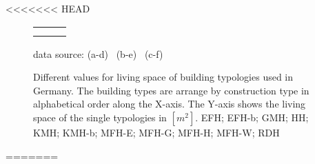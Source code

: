 <<<<<<< HEAD
\begin{figure}[htb]
\vspace{-1cm} 

\hspace{-2.5cm}
  \begin{tabular}{p{0.33\linewidth} p{0.33\linewidth} p{0.33\linewidth}}
&
&
\\

\vspace{-3cm} 
& \vspace{-3cm} 
& \vspace{-3cm}
\\
    \end{tabular}
    
\vspace{-1.6cm}
\begin{flushright}
\footnotesize{data source:
(a-d)~\cite{Blesl.2007}
(b-e)~\cite{Loga.2011}
(c-f)~\cite{Born.2003}
}
\end{flushright}
	\caption[Different values for living space of building typologies used in
	Germany.]{Different values for living space of building typologies used in
	Germany.
    The building types are arrange by construction type in alphabetical order
    along the X-axis.
	The Y-axis shows the living space of the single typologies in
	$[m^2]$.
	EFH; EFH-b; GMH; HH; KMH; KMH-b; MFH-E; MFH-G; MFH-H; MFH-W; RDH}
    \label{fig:DifTypArea}
\end{figure}
=======
